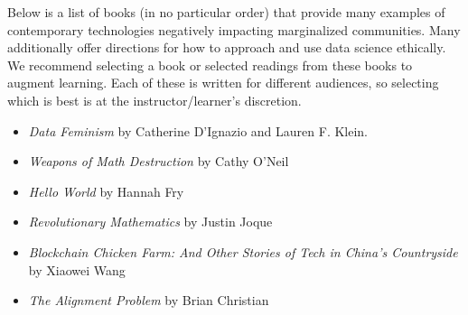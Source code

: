 \documentclass{article}
\providecommand{\tightlist}{%
  \setlength{\itemsep}{0pt}\setlength{\parskip}{0pt}}
\begin{document}
Below is a list of books (in no particular order) that provide many
examples of contemporary technologies negatively impacting marginalized
communities. Many additionally offer directions for how to approach and
use data science ethically. We recommend selecting a book or selected
readings from these books to augment learning. Each of these is written
for different audiences, so selecting which is best is at the
instructor/learner's discretion.

\begin{itemize}
\tightlist
\item
  \emph{Data Feminism} by Catherine D'Ignazio and Lauren F. Klein.
\item
  \emph{Weapons of Math Destruction} by Cathy O'Neil
\item
  \emph{Hello World} by Hannah Fry
\item
  \emph{Revolutionary Mathematics} by Justin Joque
\item
  \emph{Blockchain Chicken Farm: And Other Stories of Tech in China's
  Countryside} by Xiaowei Wang
\item
  \emph{The Alignment Problem} by Brian Christian
\end{itemize}



\end{document}
